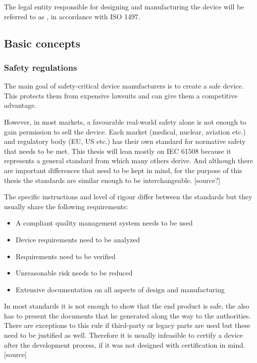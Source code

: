 The legal entity responsible for designing and manufacturing the device will be referred to as \mfg{}, in accordance with ISO 1497. 
\subsection{Basic concepts}
\subsubsection{Safety regulations}
The main goal of safety-critical device manufacturers is to create a safe device. This protects them from expensive lawsuits and can give them a competitive advantage.

However, in most markets, a favourable real-world safety alone is not enough to gain permission to sell the device.  Each market (medical, nuclear, aviation etc.) and regulatory body (EU, US etc.) has their own standard for normative safety that needs to be met. This thesis will lean mostly on IEC 61508  because it represents a general standard from which many others derive. And although there are important differences that need to be kept in mind, for the purpose of this thesis the standards are similar enough to be interchangeable. [source?]

The specific instructions and level of rigour differ between the standards but they usually share the following requirements:

\begin{itemize}
\item A compliant quality management system needs to be used
\item Device requirements need to be analyzed
\item Requirements need to be verified
\item Unreasonable risk needs to be reduced
\item Extensive documentation on all aspects of design and manufacturing
\end{itemize}

In most standards it is not enough to show that the end product is safe, the \mfg{} also has to present the documents that he generated along the way to the authorities. There are exceptions to this rule if third-party or legacy parts are used but these need to be justified as well. Therefore it is usually infeasible to certify a device after the development process, if it was not designed with certification in mind. [source]

